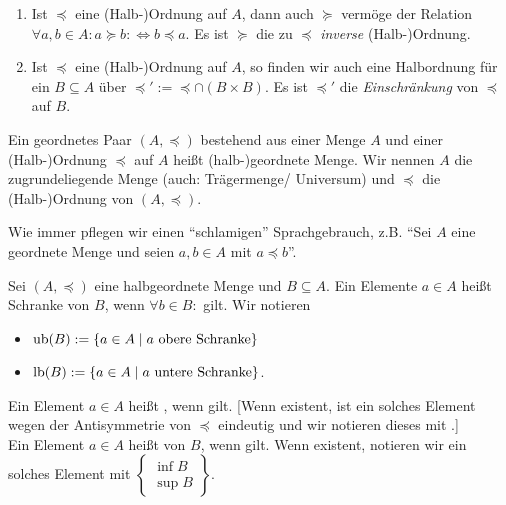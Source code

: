 \documentclass[../../main.tex]{subfiles}
\begin{document}
\begin{bem}\label{12.1.3}
	\begin{enumerate}[\normalfont(a)]
		\item Ist $\preceq$ eine (Halb-)Ordnung auf $A$, dann auch $\succeq$ vermöge der Relation $\forall a,b\in A: a\succeq b:\Longleftrightarrow b\preceq a$. Es ist $\succeq$ die zu $\preceq$ \emph{inverse} (Halb-)Ordnung.
		\item Ist $\preceq$ eine (Halb-)Ordnung auf $A$, so finden wir auch eine Halbordnung für ein $B\subseteq A$ über $\preceq':=\preceq\cap (B\times B)$. Es ist $\preceq'$ die \emph{Einschränkung} von $\preceq$ auf $B$.
	\end{enumerate}
\end{bem}

\begin{df}\label{12.1.4}
	Ein geordnetes Paar $(A,\preceq)$ bestehend aus einer Menge $A$ und einer (Halb-)Ordnung $\preceq$ auf $A$ heißt (halb-)geordnete Menge. Wir nennen $A$ die zugrundeliegende Menge (auch: Trägermenge/ Universum) und $\preceq$ die (Halb-)Ordnung von $(A,\preceq)$.
\end{df}

\begin{bem}\label{12.1.5} 
	Wie immer pflegen wir einen \enquote{schlamigen} Sprachgebrauch, z.B. \enquote{Sei $A$ eine geordnete Menge und seien $a,b\in A$ mit $a\preceq b$}.
\end{bem}

\begin{df}\label{12.1.6}
	Sei $(A,\preceq)$ eine halbgeordnete Menge und $B\subseteq A$. Ein Elemente $a\in A$ heißt  Schranke von $B$, wenn $\forall b\in B:$  gilt. Wir notieren
	\begin{itemize}
		\item $\operatorname{ub}(B):=\{a\in A\mid a\text{ obere Schranke}\}$
		\item $\operatorname{lb}(B):=\{a\in A\mid a\text{ untere Schranke}\}$.
	\end{itemize}

	\noindent Ein Element $a\in A$ heißt , wenn  gilt.  [Wenn existent, ist ein solches Element wegen der Antisymmetrie von $\preceq$ eindeutig und wir notieren dieses mit .]\\
			
	\noindent Ein Element $a\in A$ heißt  von $B$, wenn  gilt. Wenn existent, notieren wir ein solches Element mit $\left\{\begin{matrix*}\inf B \\ \sup B\end{matrix*}\right\}$.
\end{df}
\end{document}
